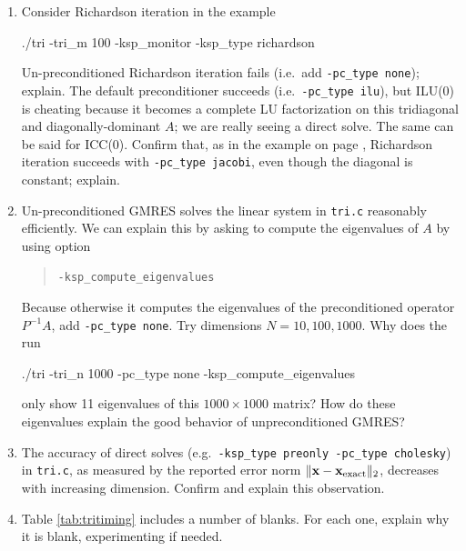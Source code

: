 \begin{enumerate}
\item Consider Richardson iteration in the example
\begin{cline}
./tri -tri_m 100 -ksp_monitor -ksp_type richardson
\end{cline}
Un-preconditioned Richardson iteration fails (i.e.~add \texttt{-pc\_type none}); explain.  The default preconditioner succeeds (i.e.~\texttt{-pc\_type ilu}), but ILU($0$) is cheating because it becomes a complete LU factorization on this tridiagonal and diagonally-dominant $A$; we are really seeing a direct solve.  The same can be said for ICC($0$).  Confirm that, as in the example on page \pageref{introprerichardson}, Richardson iteration succeeds with \texttt{-pc\_type jacobi}, even though the diagonal is constant; explain.

\item \label{exer:computeeigs} Un-preconditioned GMRES solves the linear system in \texttt{tri.c} reasonably efficiently.  We can explain this by asking \PETSc to compute the eigenvalues of $A$ by using option
\begin{quote}
\texttt{-ksp\_compute\_eigenvalues}
\end{quote}
Because otherwise it computes the eigenvalues of the preconditioned operator $P^{-1}A$, add \texttt{-pc\_type none}.  Try dimensions $N=10,100,1000$.  Why does the  run
\begin{cline}
./tri -tri_n 1000 -pc_type none -ksp_compute_eigenvalues
\end{cline}
only show 11 eigenvalues of this $1000\times 1000$ matrix?  How do these eigenvalues explain the good behavior of unpreconditioned GMRES?

\item The accuracy of direct solves (e.g.~\texttt{-ksp\_type preonly -pc\_type cholesky}) in \texttt{tri.c}, as measured by the reported error norm $\|\mathbf{x} - \mathbf{x}_{\text{exact}}\|_2$, decreases with increasing dimension.  Confirm and explain this observation.

\item Table \ref{tab:tritiming} includes a number of blanks.  For each one, explain why it is blank, experimenting if needed.


\end{enumerate}
